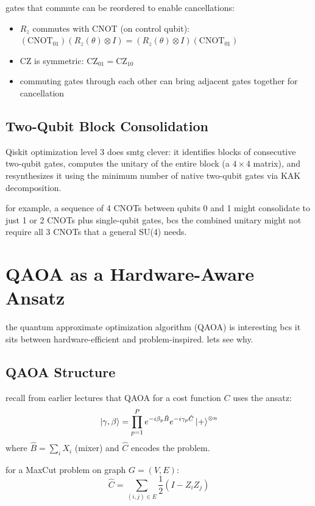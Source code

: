 \documentclass[11pt,a4paper]{article}
\theoremstyle{definition}
\theoremstyle{remark}
\begin{document}
gates that commute can be reordered to enable cancellations:
\begin{itemize}[leftmargin=*]
    \item $R_z$ commutes with CNOT (on control qubit): $(\text{CNOT}_{01})(R_z(\theta) \otimes I) = (R_z(\theta) \otimes I)(\text{CNOT}_{01})$
    \item CZ is symmetric: $\text{CZ}_{01} = \text{CZ}_{10}$
    \item commuting gates through each other can bring adjacent gates together for cancellation
\end{itemize}

\subsection{Two-Qubit Block Consolidation}

Qiskit optimization level 3 does smtg clever: it identifies blocks of consecutive two-qubit gates, computes the unitary of the entire block (a $4 \times 4$ matrix), and resynthesizes it using the minimum number of native two-qubit gates via KAK decomposition.

for example, a sequence of 4 CNOTs between qubits 0 and 1 might consolidate to just 1 or 2 CNOTs plus single-qubit gates, bcs the combined unitary might not require all 3 CNOTs that a general SU(4) needs.

\section{QAOA as a Hardware-Aware Ansatz}

the quantum approximate optimization algorithm (QAOA) is interesting bcs it sits between hardware-efficient and problem-inspired. lets see why.

\subsection{QAOA Structure}

recall from earlier lectures that QAOA for a cost function $C$ uses the ansatz:
\[
\ket{\gamma, \beta} = \prod_{p=1}^{P} e^{-i\beta_p \hat{B}} e^{-i\gamma_p \hat{C}} \ket{+}^{\otimes n}
\]
where $\hat{B} = \sum_i X_i$ (mixer) and $\hat{C}$ encodes the problem.

for a MaxCut problem on graph $G = (V, E)$:
\[
\hat{C} = \sum_{(i,j) \in E} \frac{1}{2}(I - Z_i Z_j)
\]
\end{document}
